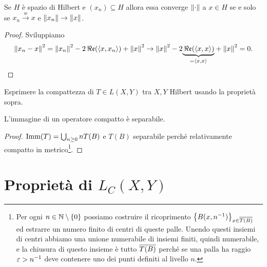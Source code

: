 \begin{proposition}
Se $H$ \`e spazio di Hilbert e $(x_n)\subseteq H$ allora essa converge ${\left\Vert{\cdot}\right\Vert}$ a $x\in H$ se e solo se $x_n\xrightarrow{w} x$ e $\left\Vert{x_n}\right\Vert\to \left\Vert{x}\right\Vert$.
\end{proposition}
\begin{proof}
Sviluppiamo
\[\left\Vert{x_n-x}\right\Vert^2=\left\Vert{x_n}\right\Vert^2-2\,\Re\mathfrak{e}(\left\langle {x,x_n}\right\rangle)+\left\Vert{x}\right\Vert^2\to \left\Vert{x}\right\Vert^2-2\underset{=\left\langle {x,x}\right\rangle}{\underbrace{\,\Re\mathfrak{e}(\left\langle {x,x}\right\rangle)}}+\left\Vert{x}\right\Vert^2=0.\]
\end{proof}

\begin{exercise}
Esprimere la compattezza di $T\in L(X,Y)$ tra $X,Y$ Hilbert usando la propriet\`a sopra.
\end{exercise}


\begin{remark}\label{ReImmagineOperatoreCompattoESeparabile}
L'immagine di un operatore compatto \`e separabile.
\end{remark}
\begin{proof}
$\operatorname{Imm}(T)=\bigcup_{n\geq 0}nT(B)$ e $T(B)$ separabile perch\'e relativamente compatto in metrico\footnote{Per ogni $n\in\mathbb{N}\setminus\{0\}$ possiamo costruire il ricoprimento $\left\{{B(x,n^{-1})}\right\}_{x\in \overline{T(B)}}$ ed estrarre un numero finito di centri di queste palle. Unendo questi insiemi di centri abbiamo una unione numerabile di insiemi finiti, quindi numerabile, e la chiusura di questo insieme \`e tutto $\overline{T(B)}$ perch\'e se una palla ha raggio $\varepsilon>n^{-1}$ deve contenere uno dei punti definiti al livello $n$.}.
\end{proof}



\section{Propriet\`a di \texorpdfstring{$L_C(X,Y)$}{LC(X,Y)}}

